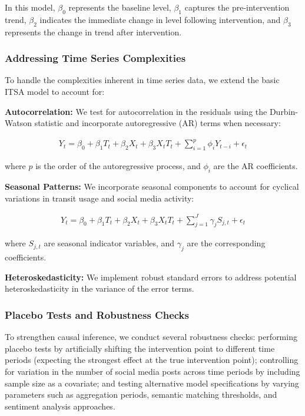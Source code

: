 \documentclass[a4paper,fleqn,12pt]{cas-sc}
\begin{document}
In this model, $\beta_0$ represents the baseline level, $\beta_1$ captures the pre-intervention trend, $\beta_2$ indicates the immediate change in level following intervention, and $\beta_3$ represents the change in trend after intervention.

\subsubsection{Addressing Time Series Complexities}

To handle the complexities inherent in time series data, we extend the basic ITSA model to account for:

\textbf{Autocorrelation:} We test for autocorrelation in the residuals using the Durbin-Watson statistic and incorporate autoregressive (AR) terms when necessary:

\begin{align}
Y_t = \beta_0 + \beta_1 T_t + \beta_2 X_t + \beta_3 X_t T_t + \sum_{i=1}^{p} \phi_i Y_{t-i} + \epsilon_t
\end{align}

where $p$ is the order of the autoregressive process, and $\phi_i$ are the AR coefficients.

\textbf{Seasonal Patterns:} We incorporate seasonal components to account for cyclical variations in transit usage and social media activity:

\begin{align}
Y_t = \beta_0 + \beta_1 T_t + \beta_2 X_t + \beta_3 X_t T_t + \sum_{j=1}^{J} \gamma_j S_{j,t} + \epsilon_t
\end{align}

where $S_{j,t}$ are seasonal indicator variables, and $\gamma_j$ are the corresponding coefficients.

\textbf{Heteroskedasticity:} We implement robust standard errors to address potential heteroskedasticity in the variance of the error terms.

\subsubsection{Placebo Tests and Robustness Checks}

To strengthen causal inference, we conduct several robustness checks: performing placebo tests by artificially shifting the intervention point to different time periods (expecting the strongest effect at the true intervention point); controlling for variation in the number of social media posts across time periods by including sample size as a covariate; and testing alternative model specifications by varying parameters such as aggregation periods, semantic matching thresholds, and sentiment analysis approaches.
\end{document}

